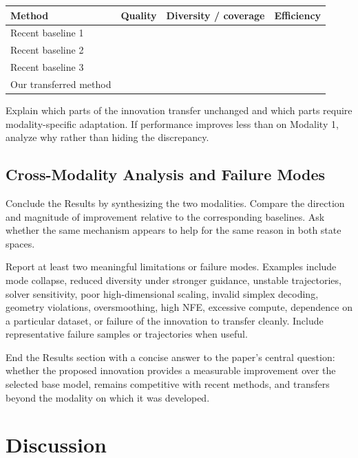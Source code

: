 \documentclass{article}
\begin{document}
\begin{center}
\small
\begin{tabular}{lccc}
\toprule
Method & Quality & Diversity / coverage & Efficiency \\
\midrule
Recent baseline 1 & & & \\
Recent baseline 2 & & & \\
Recent baseline 3 & & & \\
Our transferred method & & & \\
\bottomrule
\end{tabular}
\end{center}

Explain which parts of the innovation transfer unchanged and which parts require modality-specific adaptation. If performance improves less than on Modality 1, analyze why rather than hiding the discrepancy.

\subsection{Cross-Modality Analysis and Failure Modes}

Conclude the Results by synthesizing the two modalities. Compare the direction and magnitude of improvement relative to the corresponding baselines. Ask whether the same mechanism appears to help for the same reason in both state spaces.

Report at least two meaningful limitations or failure modes. Examples include mode collapse, reduced diversity under stronger guidance, unstable trajectories, solver sensitivity, poor high-dimensional scaling, invalid simplex decoding, geometry violations, oversmoothing, high NFE, excessive compute, dependence on a particular dataset, or failure of the innovation to transfer cleanly. Include representative failure samples or trajectories when useful.

End the Results section with a concise answer to the paper's central question: whether the proposed innovation provides a measurable improvement over the selected base model, remains competitive with recent methods, and transfers beyond the modality on which it was developed.

\section{Discussion}
\end{document}
